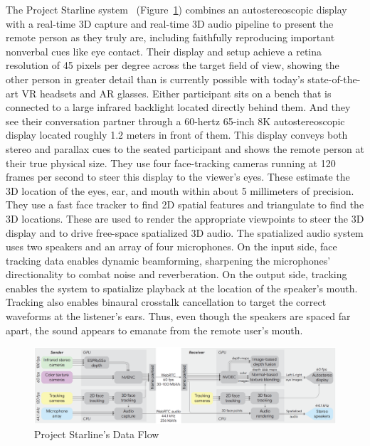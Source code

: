 The Project Starline system~\cite{google_ar__vr_project_2021} (Figure~\ref{fig:starline-data-flow}) combines an autostereoscopic display with a real-time 3D capture and real-time 3D audio pipeline to present the remote person as they truly are, including faithfully reproducing important nonverbal cues like eye contact. Their display and setup achieve a retina resolution of 45 pixels per degree across the target field of view, showing the other person in greater detail than is currently possible with today's state-of-the-art VR headsets and AR glasses. Either participant sits on a bench that is connected to a large infrared backlight located directly behind them. And they see their conversation partner through a 60-hertz 65-inch 8K autostereoscopic display located roughly 1.2 meters in front of them. This display conveys both stereo and parallax cues to the seated participant and shows the remote person at their true physical size. They use four face-tracking cameras running at 120 frames per second to steer this display to the viewer's eyes. These estimate the 3D location of the eyes, ear, and mouth within about 5 millimeters of precision. They use a fast face tracker to find 2D spatial features and triangulate to find the 3D locations. These are used to render the appropriate viewpoints to steer the 3D display and to drive free-space spatialized 3D audio. The spatialized audio system uses two speakers and an array of four microphones. On the input side, face tracking data enables dynamic beamforming, sharpening the microphones' directionality to combat noise and reverberation. On the output side, tracking enables the system to spatialize playback at the location of the speaker's mouth. Tracking also enables binaural crosstalk cancellation to target the correct waveforms at the listener's ears. Thus, even though the speakers are spaced far apart, the sound appears to emanate from the remote user's mouth.

\begin{figure}[!h]
    \includegraphics[width=1\columnwidth]{figures/project-starline-data-flow.png}
    \caption{Project Starline's Data Flow~\cite{lawrence_project_2021}}
    \label{fig:starline-data-flow}
\end{figure}

